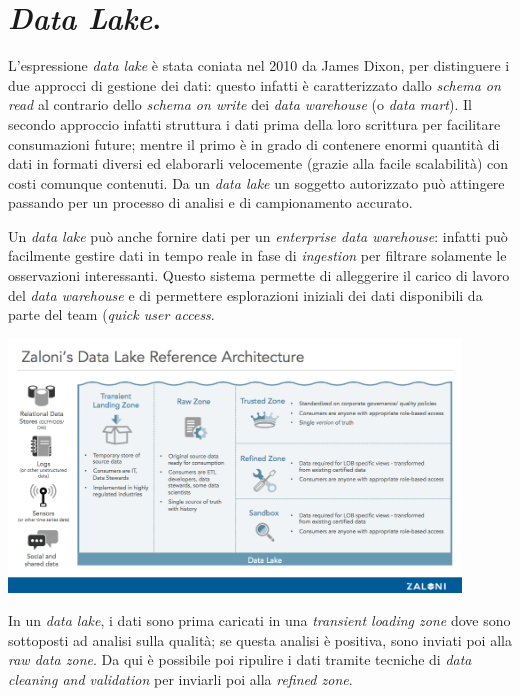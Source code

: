\documentclass[a4page, 11pt]{article}
\begin{document}
\section{\textit{Data Lake}.}
L'espressione \textit{data lake} è stata coniata nel 2010 da James Dixon, per distinguere i due approcci di gestione dei dati: questo infatti è caratterizzato dallo \textit{schema on read} al contrario dello \textit{schema on write} dei \textit{data warehouse} (o \textit{data mart}).
Il secondo approccio infatti struttura i dati prima della loro scrittura per facilitare consumazioni future; mentre il primo è in grado di contenere enormi quantità di dati in formati diversi ed elaborarli velocemente (grazie alla facile scalabilità) con costi comunque contenuti.
Da un \textit{data lake} un soggetto autorizzato può attingere passando per un processo di analisi e di campionamento accurato.

Un \textit{data lake} può anche fornire dati per un \textit{enterprise data warehouse}: infatti può facilmente gestire dati in tempo reale in fase di \textit{ingestion} per filtrare solamente le osservazioni interessanti.
Questo sistema permette di alleggerire il carico di lavoro del \textit{data warehouse} e di permettere esplorazioni iniziali dei dati disponibili da parte del team (\textit{quick user access}.
\begin{center}
  \includegraphics[width=120mm]{data_lake_arch.png}
\end{center}

In un \textit{data lake}, i dati sono prima caricati in una \textit{transient loading zone} dove sono sottoposti ad analisi sulla qualità; se questa analisi è positiva, sono inviati poi alla \textit{raw data zone}.
Da qui è possibile poi ripulire i dati tramite tecniche di \textit{data cleaning and validation} per inviarli poi alla \textit{refined zone}.
\end{document}
